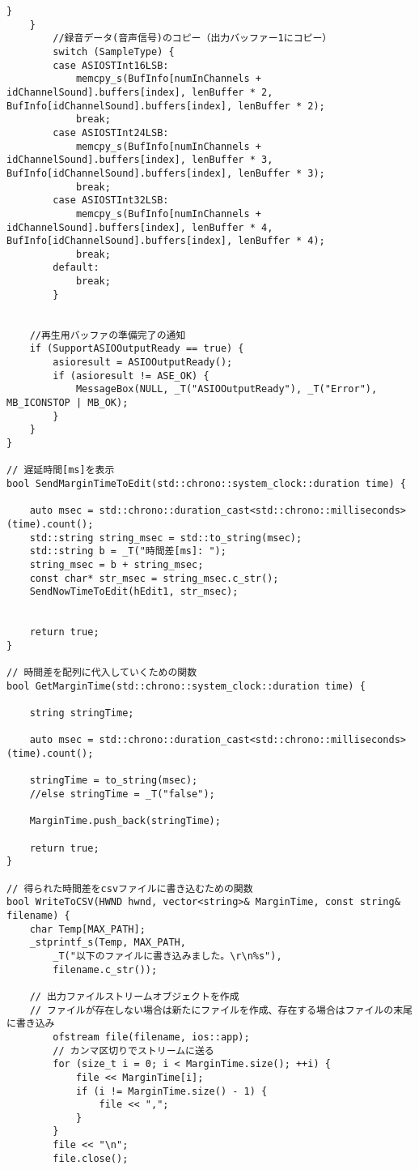 \begin{lstlisting}[caption=main.cpp]
		}
	}
		//録音データ(音声信号)のコピー（出力バッファー1にコピー）
		switch (SampleType) {
		case ASIOSTInt16LSB:
			memcpy_s(BufInfo[numInChannels + idChannelSound].buffers[index], lenBuffer * 2, BufInfo[idChannelSound].buffers[index], lenBuffer * 2);
			break;
		case ASIOSTInt24LSB:
			memcpy_s(BufInfo[numInChannels + idChannelSound].buffers[index], lenBuffer * 3, BufInfo[idChannelSound].buffers[index], lenBuffer * 3);
			break;
		case ASIOSTInt32LSB:
			memcpy_s(BufInfo[numInChannels + idChannelSound].buffers[index], lenBuffer * 4, BufInfo[idChannelSound].buffers[index], lenBuffer * 4);
			break;
		default:
			break;
		}
	

	//再生用バッファの準備完了の通知
	if (SupportASIOOutputReady == true) {
		asioresult = ASIOOutputReady();
		if (asioresult != ASE_OK) {
			MessageBox(NULL, _T("ASIOOutputReady"), _T("Error"), MB_ICONSTOP | MB_OK);
		}
	}
}

// 遅延時間[ms]を表示
bool SendMarginTimeToEdit(std::chrono::system_clock::duration time) {

	auto msec = std::chrono::duration_cast<std::chrono::milliseconds>(time).count();
	std::string string_msec = std::to_string(msec);
	std::string b = _T("時間差[ms]: ");
	string_msec = b + string_msec;
	const char* str_msec = string_msec.c_str();
	SendNowTimeToEdit(hEdit1, str_msec);
	

	return true;
}

// 時間差を配列に代入していくための関数
bool GetMarginTime(std::chrono::system_clock::duration time) {

	string stringTime;

	auto msec = std::chrono::duration_cast<std::chrono::milliseconds>(time).count();
	
	stringTime = to_string(msec);
	//else stringTime = _T("false"); 

	MarginTime.push_back(stringTime);

	return true;
}

// 得られた時間差をcsvファイルに書き込むための関数
bool WriteToCSV(HWND hwnd, vector<string>& MarginTime, const string& filename) {
	char Temp[MAX_PATH];
	_stprintf_s(Temp, MAX_PATH,
		_T("以下のファイルに書き込みました。\r\n%s"),
		filename.c_str());

	// 出力ファイルストリームオブジェクトを作成
	// ファイルが存在しない場合は新たにファイルを作成、存在する場合はファイルの末尾に書き込み
		ofstream file(filename, ios::app);
		// カンマ区切りでストリームに送る
		for (size_t i = 0; i < MarginTime.size(); ++i) {
			file << MarginTime[i];
			if (i != MarginTime.size() - 1) {
				file << ",";
			}
		}
		file << "\n";
		file.close();


\end{lstlisting}
